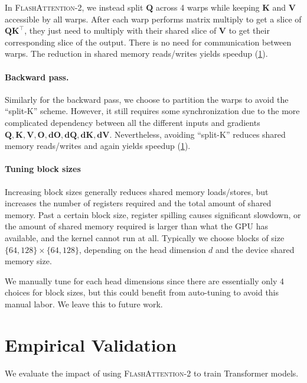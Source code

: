 In \textsc{FlashAttention-2}, we instead split $\mathbf{Q}$ across 4 warps while keeping $\mathbf{K}$ and $\mathbf{V}$
accessible by all warps. After each warp performs matrix multiply to get a slice of $\mathbf{Q} \mathbf{K}^\top$, they just need to multiply with their shared slice of $\mathbf{V}$ to get their corresponding slice of the output. There is no need for communication between warps. The reduction in shared memory reads/writes yields speedup (\ref{sec:experiments}).

\paragraph{Backward pass.} Similarly for the backward pass, we choose to partition the warps to avoid the ``split-K'' scheme. However, it still requires some synchronization due to the more complicated dependency between all the different inputs and gradients
$\mathbf{Q}, \mathbf{K}, \mathbf{V}, \mathbf{O}, \mathbf{dO}, \mathbf{dQ}, \mathbf{dK}, \mathbf{dV}$.
Nevertheless, avoiding ``split-K'' reduces shared memory reads/writes and again yields speedup (\ref{sec:experiments}).

\paragraph{Tuning block sizes} Increasing block sizes generally reduces shared memory loads/stores, but increases the number of registers required and the total amount of shared memory. Past a certain block size, register spilling causes significant slowdown, or the amount of shared memory required is larger than what the GPU has available, and the kernel cannot run at all. Typically we choose blocks of size $\{64, 128\} \times \{64, 128\}$, depending on the head dimension $d$ and the device shared memory size.

We manually tune for each head dimensions since there are essentially only 4 choices for block sizes, but this could benefit from auto-tuning to avoid this manual labor. We leave this to future work.

\section{Empirical Validation}
\label{sec:experiments}

We evaluate the impact of using \textsc{FlashAttention-2} to train Transformer models.

